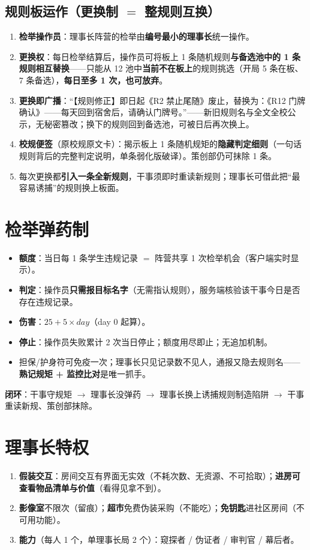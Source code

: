 \documentclass[UTF8, fontset=none, 11pt]{ctexart}
\begin{document}
\subsection{规则板运作（更换制 $=$ 整规则互换）}
\begin{enumerate}
  \item \textbf{检举操作员}：理事长阵营的检举由\textbf{编号最小的理事长}统一操作。
  \item \textbf{更换权}：每日检举结算后，操作员可将板上 1 条随机规则\textbf{与备选池中的 1 条规则相互替换}——只能从 12 池中\textbf{当前不在板上}的规则挑选（开局 5 条在板、7 条备选），\textbf{每日至多 1 次，也可放弃}。
  \item \textbf{更换即广播}：``【规则修正】即日起《R2 禁止尾随》废止，替换为：《R12 门牌确认》——每天回到宿舍后，请确认门牌号。''——新旧规则名与全文全校公示，无秘密篡改；换下的规则回到备选池，可被日后再次换上。
  \item \textbf{校规便签}（原校规原文卡）：揭示板上 1 条随机规矩的\textbf{隐藏判定细则}（一句话规则背后的完整判定说明，单条弱化版破译）。策创部仍可抹除 1 条。
  \item 每次更换都\textbf{引入一条全新规则}，干事须即时重读新规则；理事长可借此把``最容易诱捕''的规则换上板面。
\end{enumerate}

\section{检举弹药制}
\begin{itemize}
  \item \textbf{额度}：当日每 1 条学生违规记录 $=$ 阵营共享 1 次检举机会（客户端实时显示）。
  \item \textbf{判定}：操作员\textbf{只需报目标名字}（无需指认规则），服务端核验该干事今日是否存在违规记录。
  \item \textbf{伤害}：$25 + 5 \times day$（day 0 起算）。
  \item \textbf{停止}：操作员失败累计 2 次当日停止；额度用尽即止；无追加机制。
  \item 担保/护身符可免疫一次；理事长只见记录数不见人，通报又隐去规则名——\textbf{熟记规矩 + 监控比对}是唯一抓手。
\end{itemize}
\textbf{闭环}：干事守规矩 $\to$ 理事长没弹药 $\to$ 理事长换上诱捕规则制造陷阱 $\to$ 干事重读新规、策创部抹除。

\section{理事长特权}
\begin{enumerate}
  \item \textbf{假装交互}：房间交互有界面无实效（不耗次数、无资源、不可拾取）；\textbf{进房可查看物品清单与价值}（看得见拿不到）。
  \item \textbf{影像室}不限次（留痕）；\textbf{超市}免费伪装采购（不能吃）；\textbf{免钥匙}进社区房间（不可用功能）。
  \item \textbf{能力}（每人 1 个，单理事长局 2 个）：窥探者 / 伪证者 / 审判官 / 幕后者。
\end{enumerate}
\end{document}
